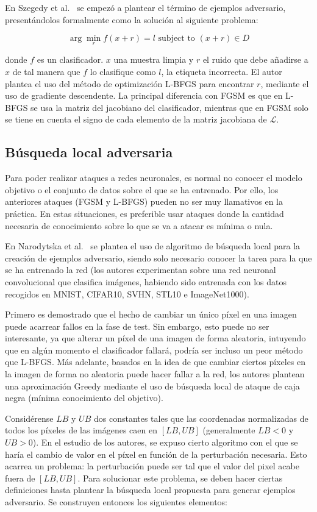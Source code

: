 En Szegedy et al.~\cite{DataManifold} se empezó a plantear el término de ejemplos adversario, presentándolos formalmente como la solución al siguiente problema:

$$\arg \min_{r} f(x+r) = l \text{ subject to }(x+r) \in D$$

donde $f$ es un clasificador. $x$ una muestra limpia y $r$ el ruido que debe añadirse a $x$ de tal manera que $f$ lo clasifique como $l$, la etiqueta incorrecta. El autor plantea el uso del método de optimización L-BFGS para encontrar $r$, mediante el uso de gradiente descendente. La principal diferencia con FGSM es que en L-BFGS se usa la matriz del jacobiano del clasificador, mientras que en FGSM solo se tiene en cuenta el signo de cada elemento de la matriz jacobiana de $\mathcal{L}$.

\subsection*{Búsqueda local adversaria}

Para poder realizar ataques a redes neuronales, es normal no conocer el modelo objetivo o el conjunto de datos sobre el que se ha entrenado. Por ello, los anteriores ataques (FGSM y L-BFGS) pueden no ser muy llamativos en la práctica. En estas situaciones, es preferible usar ataques donde la cantidad necesaria de conocimiento sobre lo que se va a atacar es mínima o nula.

En Narodytska et al.~\cite{LocalSearchAdv} se plantea el uso de algoritmo de búsqueda local para la creación de ejemplos adversario, siendo solo necesario conocer la tarea para la que se ha entrenado la red (los autores experimentan sobre una red neuronal convolucional que clasifica imágenes, habiendo sido entrenada con los datos recogidos en MNIST, CIFAR10, SVHN, STL10 e ImageNet1000). 

Primero es demostrado que el hecho de cambiar un único píxel en una imagen puede acarrear fallos en la fase de test. Sin embargo, esto puede no ser interesante, ya que alterar un píxel de una imagen de forma aleatoria, intuyendo que en algún momento el clasificador fallará, podría ser incluso un peor método que L-BFGS. Más adelante, basados en la idea de que cambiar ciertos píxeles en la imagen de forma no aleatoria puede hacer fallar a la red, los autores plantean una aproximación Greedy mediante el uso de búsqueda local de ataque de caja negra (mínima conocimiento del objetivo).

Considérense $LB$ y $UB$ dos constantes tales que las coordenadas normalizadas de todos los píxeles de las imágenes caen en $[LB,UB]$ (generalmente $LB < 0$ y $UB > 0$). En el estudio de los autores, se expuso cierto algoritmo con el que se haría el cambio de valor en el píxel en función de la perturbación necesaria. Esto acarrea un problema: la perturbación puede ser tal que el valor del pixel acabe fuera de $[LB,UB]$. Para solucionar este problema, se deben hacer ciertas definiciones hasta plantear la búsqueda local propuesta para generar ejemplos adversario. Se construyen entonces los siguientes elementos:

